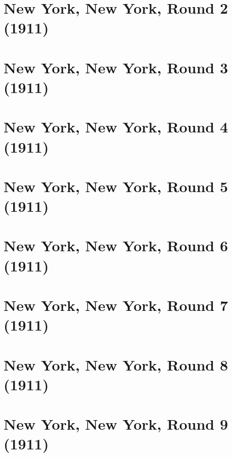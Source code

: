 \documentclass[11pt]{article}
\begin{document}
\clearpage



\clearpage



\clearpage

\section{New York, New York, Round 2 (1911)}


\clearpage

\section{New York, New York, Round 3 (1911)}


\clearpage

\section{New York, New York, Round 4 (1911)}


\clearpage

\section{New York, New York, Round 5 (1911)}


\clearpage

\section{New York, New York, Round 6 (1911)}


\clearpage

\section{New York, New York, Round 7 (1911)}


\clearpage

\section{New York, New York, Round 8 (1911)}


\clearpage

\section{New York, New York, Round 9 (1911)}

\end{document}
